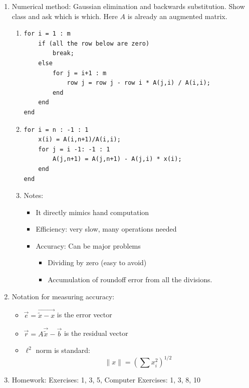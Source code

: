 \documentclass{article}
\theoremstyle{remark}
\begin{document}
\begin{enumerate}
\item Numerical method: Gaussian elimination and backwards substitution. Show class and ask which is which. Here $A$ is already an augmented matrix.
\begin{enumerate}
\item 
\begin{verbatim}
for i = 1 : m
    if (all the row below are zero)
        break;
    else
        for j = i+1 : m
            row j = row j - row i * A(j,i) / A(i,i);
        end
    end
end
\end{verbatim}
\item 
\begin{verbatim}
for i = n : -1 : 1
    x(i) = A(i,n+1)/A(i,i);
    for j = i -1: -1 : 1
        A(j,n+1) = A(j,n+1) - A(j,i) * x(i);
    end
end
\end{verbatim}
\item Notes: 
\begin{itemize}
\item It directly mimics hand computation
\item Efficiency: very slow, many operations needed
\item Accuracy: Can be major problems
\begin{itemize}
\item Dividing by zero (easy to avoid)
\item Accumulation of roundoff error from all the divisions.
\end{itemize}
\end{itemize}
\end{enumerate}

\item Notation for measuring accuracy:
\begin{itemize}
\item $\vec{e} = \vec{\tilde{x}-x}$ is the error vector
\item $\vec{r} = A\vec{\tilde{x}}-\vec{b}$ is the residual vector
\item $\ell^2$ norm is standard:
\[
\| x \| = \left( \sum x_i^2 \right)^{1/2}
\]
\end{itemize}

\item Homework: Exercises: 1, 3, 5, Computer Exercises: 1, 3, 8, 10
\end{enumerate}
\end{document}
